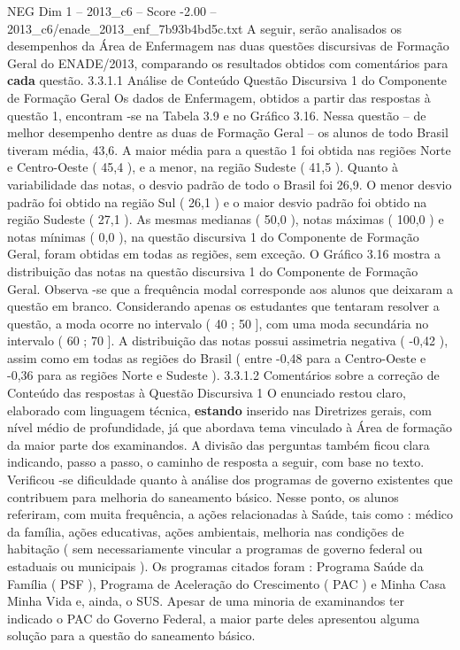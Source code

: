 \begin{textsample}{NEG Dim 1 – 2013\_c6 – Score -2.00 – 2013\_c6/enade\_2013\_enf\_7b93b4bd5c.txt}
A seguir, serão analisados os desempenhos da Área de Enfermagem nas duas questões discursivas de Formação Geral do ENADE/2013, comparando os resultados obtidos com comentários para \textbf{cada} questão. 3.3.1.1 Análise de Conteúdo Questão Discursiva 1 do Componente de Formação Geral Os dados de Enfermagem, obtidos a partir das respostas à questão 1, encontram -se na Tabela 3.9 e no Gráfico 3.16.
Nessa questão – de melhor desempenho dentre as duas de Formação Geral – os alunos de todo Brasil tiveram média, 43,6.
A maior média para a questão 1 foi obtida nas regiões Norte e Centro-Oeste ( 45,4 ), e a menor, na região Sudeste ( 41,5 ).
Quanto à variabilidade das notas, o desvio padrão de todo o Brasil foi 26,9.
O menor desvio padrão foi obtido na região Sul ( 26,1 ) e o maior desvio padrão foi obtido na região Sudeste ( 27,1 ).
As mesmas medianas ( 50,0 ), notas máximas ( 100,0 ) e notas mínimas ( 0,0 ), na questão discursiva 1 do Componente de Formação Geral, foram obtidas em todas as regiões, sem exceção.
O Gráfico 3.16 mostra a distribuição das notas na questão discursiva 1 do Componente de Formação Geral.
Observa -se que a frequência modal corresponde aos alunos que deixaram a questão em branco.
Considerando apenas os estudantes que tentaram resolver a questão, a moda ocorre no intervalo ( 40 ; 50 ], com uma moda secundária no intervalo ( 60 ; 70 ].
A distribuição das notas possui assimetria negativa ( -0,42 ), assim como em todas as regiões do Brasil ( entre -0,48 para a Centro-Oeste e -0,36 para as regiões Norte e Sudeste ). 3.3.1.2 Comentários sobre a correção de Conteúdo das respostas à Questão Discursiva 1 O enunciado restou claro, elaborado com linguagem técnica, \textbf{estando} inserido nas Diretrizes gerais, com nível médio de profundidade, já que abordava tema vinculado à Área de formação da maior parte dos examinandos.
A divisão das perguntas também ficou clara indicando, passo a passo, o caminho de resposta a seguir, com base no texto.
Verificou -se dificuldade quanto à análise dos programas de governo existentes que contribuem para melhoria do saneamento básico.
Nesse ponto, os alunos referiram, com muita frequência, a ações relacionadas à Saúde, tais como : médico da família, ações educativas, ações ambientais, melhoria nas condições de habitação ( sem necessariamente vincular a programas de governo federal ou estaduais ou municipais ).
Os programas citados foram : Programa Saúde da Família ( PSF ), Programa de Aceleração do Crescimento ( PAC ) e Minha Casa Minha Vida e, ainda, o SUS.
Apesar de uma minoria de examinandos ter indicado o PAC do Governo Federal, a maior parte deles apresentou alguma solução para a questão do saneamento básico.

\end{textsample}
